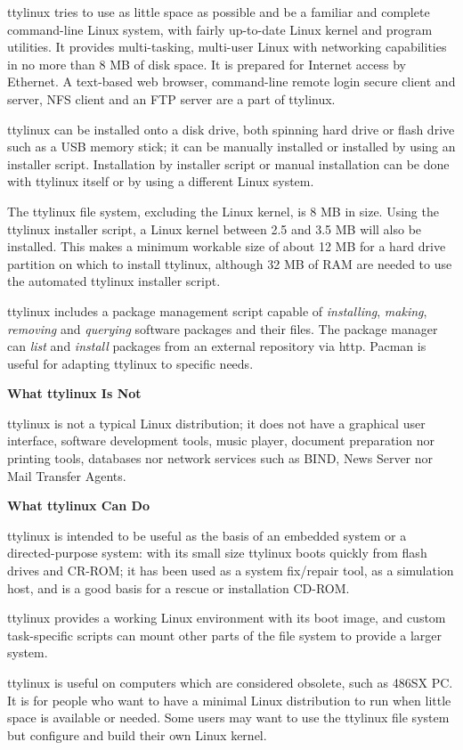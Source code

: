 \documentclass[10pt]{article}
\begin{document}
ttylinux tries to use as little space as possible and be a familiar and
complete command-line Linux system, with fairly up-to-date Linux kernel and
program utilities. It provides multi-tasking, multi-user Linux with networking
capabilities in no more than 8 MB of disk space. It is prepared for Internet
access by Ethernet. A text-based web browser, command-line remote login secure
client and server, NFS client and an FTP server are a part of ttylinux.

ttylinux can be installed onto a disk drive, both spinning hard drive or flash
drive such as a USB memory stick; it can be manually installed or installed by
using an installer script. Installation by installer script or manual
installation can be done with ttylinux itself or by using a different Linux
system.

The ttylinux file system, excluding the Linux kernel, is 8 MB in size. Using
the ttylinux installer script, a Linux kernel between 2.5 and 3.5 MB will also
be installed. This makes a minimum workable size of about 12 MB for a hard drive
partition on which to install ttylinux, although 32 MB of RAM are needed to
use the automated ttylinux installer script.

ttylinux includes a package management script capable of {\it installing},
{\it making}, {\it removing} and {\it querying} software packages and their
files. The package manager can {\it list} and {\it install} packages from an
external repository via http. Pacman is useful for adapting ttylinux to
specific needs.

{\bf What ttylinux Is Not}

ttylinux is not a typical Linux distribution; it does not have a graphical user
interface, software development tools, music player, document preparation nor
printing tools, databases nor network services such as BIND, News Server nor
Mail Transfer Agents.

{\bf What ttylinux Can Do}

ttylinux is intended to be useful as the basis of an embedded system or a
directed-purpose system: with its small size ttylinux boots quickly from flash
drives and CR-ROM; it has been used as a system fix/repair tool, as a
simulation host, and is a good basis for a rescue or installation CD-ROM.

ttylinux provides a working Linux environment with its boot image, and custom
task-specific scripts can mount other parts of the file system to provide a
larger system.

ttylinux is useful on computers which are considered obsolete, such as 486SX
PC. It is for people who want to have a minimal Linux distribution to run when
little space is available or needed. Some users may want to use the ttylinux
file system but configure and build their own Linux kernel.
\end{document}
